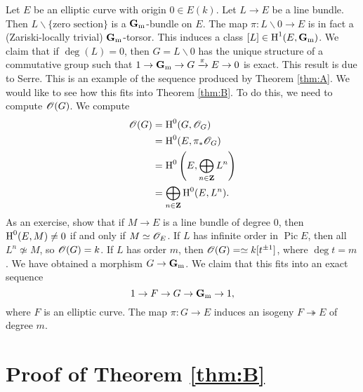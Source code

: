 \documentclass{article}
\begin{document}
\begin{example}
Let $E$ be an elliptic curve with origin $0\in E(k)$. Let $L\to E$ be a line 
bundle. Then $L\smallsetminus \{\text{zero section}\}$ is a $\mathbf{G}_{\mathrm{m}}$-bundle 
on $E$. The map $\pi:L\smallsetminus0 \to E$ is in fact a (Zariski-locally 
trivial) $\mathbf{G}_{\mathrm{m}}$-torsor. This induces a class $[L]\in \operatorname{H}^1(E,\mathbf{G}_{\mathrm{m}})$. 
We claim that if $\deg(L)=0$, then $G=L\smallsetminus 0$ has the unique structure 
of a commutative group such that $1 \to \mathbf{G}_{\mathrm{m}} \to G \xrightarrow\pi E \to 0$ 
is exact. This result is due to Serre. This is an example of the sequence produced 
by Theorem \ref{thm:A}. We would like to see how this fits into Theorem 
\ref{thm:B}. To do this, we need to compute $\mathscr{O}(G)$. We compute 
\begin{align*}
  \mathscr{O}(G) &= \operatorname{H}^0(G,\mathscr{O}_G) \\
    &= \operatorname{H}^0(E,\pi_\ast \mathscr{O}_G) \\
    &= \operatorname{H}^0\left(E,\bigoplus_{n\in \mathbf{Z}} L^n\right) \\
    &= \bigoplus_{n\in \mathbf{Z}} \operatorname{H}^0(E,L^n) .
\end{align*}
As an exercise, show that if $M\to E$ is a line bundle of degree $0$, then 
$\operatorname{H}^0(E,M)\ne 0$ if and only if $M\simeq \mathscr{O}_E$. If $L$ has infinite order 
in $\operatorname{Pic} E$, then all $L^n\not\simeq M$, so $\mathscr{O}(G)=k$. If 
$L$ has order $m$, then $\mathscr{O}(G)=\simeq k[t^{\pm 1}]$, where 
$\deg t=m$. We have obtained a morphism $G\to \mathbf{G}_{\mathrm{m}}$. We claim that this 
fits into an exact sequence 
\[
  1 \to F \to G \to \mathbf{G}_{\mathrm{m}} \to 1 ,
\]
where $F$ is an elliptic curve. The map $\pi:G\to E$ induces an isogeny 
$F\twoheadrightarrow E$ of degree $m$. 
\end{example}





\section{Proof of \texorpdfstring{Theorem \ref{thm:B}}{Theorem B}}
\end{document}
